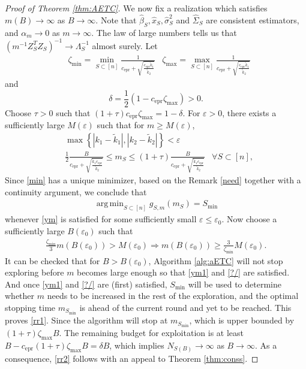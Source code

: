 \documentclass[a4paper,11pt]{article}
\numberwithin{equation}{section}
\theoremstyle{plain}
\theoremstyle{definition}
\def\e{{\varepsilon}}
\def\ex{{\text{epr}}}
\DeclareMathOperator*{\argmin}{arg\,min}
\begin{document}
\begin{proof}[Proof of Theorem \ref{thm:AETC}]
We now fix a realization which satisfies $m(B)\to\infty$ as $B\to\infty$.  
Note that $\widehat{\beta}_S, \widehat{x}_S, \widehat{\sigma}_S^2$ and $\widehat{\Sigma}_S$ are consistent estimators, and $\alpha_m\to 0$ as $m\to\infty$.
The law of large numbers tells us that $(m^{-1}Z^T_SZ_S)^{-1}\to\Lambda_S^{-1}$ almost surely.
Let 
\begin{align*}
&\zeta_{\min} = \min_{S\subset [n]}\frac{1}{c_{\ex}+\sqrt{\frac{c_{\ex}\tilde{k}_1}{\tilde{k}_2}}}&\zeta_{\max} = \max_{S\subset [n]}\frac{1}{c_{\ex}+\sqrt{\frac{c_{\ex}\tilde{k}_1}{\tilde{k}_2}}}
\end{align*}
and 
$$\delta = \frac{1}{2}(1-c_{\ex}\zeta_{\max})>0.$$ Choose $\tau>0$ such that $(1+\tau)c_{\ex}\zeta_{\max} = 1-\delta$.
For $\e>0$, there exists a sufficiently large $M(\e)$ such that for $m\geq M(\e)$,
\begin{align}
&\max\left\{|k_1-\tilde{k}_1|, |k_2-\tilde{k}_2|\right\}<\e\label{ym}\\
&\frac{1}{2}\frac{B}{c_{\ex}+\sqrt{\frac{\tilde{k}_1c_{\ex}}{\tilde{k}_2}}}\leq m_S\leq (1+\tau)\frac{B}{c_{\ex}+\sqrt{\frac{\tilde{k}_1c_{\ex}}{\tilde{k}_2}}}& \forall S\subset [n]\label{ym1},
\end{align}
Since \eqref{min} has a unique minimizer, based on the Remark \ref{need} together with a continuity argument, we conclude that 
\begin{align}
\argmin_{S\subset [n]}g_{S,m}(m_S) = S_{\min}\label{?/}
\end{align}
whenever \eqref{ym} is satisfied for some sufficiently small $\e \leq \e_0$. 
Now choose a sufficiently large $B(\e_0)$ such that 
\begin{align*}
\frac{\zeta_{\min}}{3}m(B(\e_0))>M(\e_0)\Longrightarrow m(B(\e_0))\geq\frac{3}{\zeta_{\min}}M(\e_0).
\end{align*}
It can be checked that for $B>B(\e_0)$, Algorithm \ref{alg:aETC} will not stop exploring before $m$ becomes large enough so that \eqref{ym1} and \eqref{?/} are satisfied. And once \eqref{ym1} and \eqref{?/} are (first) satisfied, $S_{\min}$ will be used to determine whether $m$ needs to be increased in the rest of the exploration, and the optimal stopping time $m_{S_{\min}}$ is ahead of the current round and yet to be reached. 
This proves \eqref{rr1}. 
Since the algorithm will stop at $m_{S_{\min}}$, which is upper bounded by $(1+\tau)\zeta_{\max}B$.
The remaining budget for exploitation is at least $B - c_{\ex}(1+\tau)\zeta_{\max}B = \delta B$, which implies $N_{S(B)}\to\infty$ as $B\to\infty$.   
As a consequence, \eqref{rr2} follows with an appeal to Theorem \ref{thm:conss}. 
\end{proof}
\end{document}
